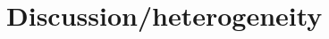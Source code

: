 \documentclass[../main.tex]{subfiles}
\begin{document}
\section{Discussion/heterogeneity}
\label{sec:Discussion}
\end{document}
